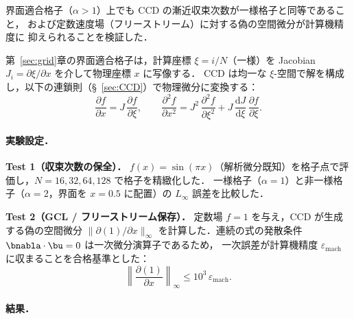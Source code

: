 %

界面適合格子（$\alpha>1$）上でも CCD の漸近収束次数が一様格子と同等であること，
および定数速度場（フリーストリーム）に対する偽の空間微分が計算機精度に
抑えられることを検証した．

第~\ref{sec:grid}章の界面適合格子は，計算座標 $\xi=i/N$（一様）を Jacobian
$J_i=\partial\xi/\partial x$ を介して物理座標 $x$ に写像する．
CCD は均一な $\xi$-空間で解を構成し，以下の連鎖則（§~\ref{sec:CCD}）で物理微分に変換する：
\begin{equation}
  \frac{\partial f}{\partial x} = J\,\frac{\partial f}{\partial\xi}, \qquad
  \frac{\partial^2 f}{\partial x^2}
    = J^2\,\frac{\partial^2 f}{\partial\xi^2}
      + J\,\frac{\mathrm{d}J}{\mathrm{d}\xi}\,\frac{\partial f}{\partial\xi}.
  \label{eq:gcl_chain}
\end{equation}

\paragraph{実験設定．}

\textbf{Test 1（収束次数の保全）．}
$f(x)=\sin(\pi x)$（解析微分既知）を格子点で評価し，$N=16,32,64,128$ で格子を精緻化した．
一様格子（$\alpha=1$）と非一様格子（$\alpha=2$，界面を $x=0.5$ に配置）の
$L_\infty$ 誤差を比較した．

\textbf{Test 2（GCL / フリーストリーム保存）．}
定数場 $f=1$ を与え，CCD が生成する偽の空間微分 $\|\partial(1)/\partial x\|_\infty$
を計算した．連続の式の発散条件 $\bnabla\cdot\bu=0$ は一次微分演算子であるため，
一次誤差が計算機精度 $\varepsilon_\mathrm{mach}$ に収まることを合格基準とした：
\begin{equation}
  \left\|\frac{\partial(1)}{\partial x}\right\|_\infty \leq 10^3\,\varepsilon_\mathrm{mach}.
  \label{eq:gcl_criterion}
\end{equation}

\paragraph{結果．}

